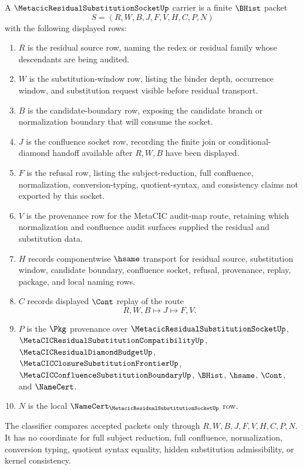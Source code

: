 \begin{definition}
\label{def:metacic-residual-substitution-socket-carrier}
A $\MetacicResidualSubstitutionSocketUp$ carrier is a finite $\BHist$ packet
$$
S=(R,W,B,J,F,V,H,C,P,N)
$$
with the following displayed rows:
\begin{enumerate}
\item $R$ is the residual source row, naming the redex or residual family whose descendants are being audited.
\item $W$ is the substitution-window row, listing the binder depth, occurrence window, and substitution request visible before residual transport.
\item $B$ is the candidate-boundary row, exposing the candidate branch or normalization boundary that will consume the socket.
\item $J$ is the confluence socket row, recording the finite join or conditional-diamond handoff available after $R,W,B$ have been displayed.
\item $F$ is the refusal row, listing the subject-reduction, full confluence, normalization, conversion-typing, quotient-syntax, and consistency claims not exported by this socket.
\item $V$ is the provenance row for the MetaCIC audit-map route, retaining which normalization and confluence audit surfaces supplied the residual and substitution data.
\item $H$ records componentwise $\hsame$ transport for residual source, substitution window, candidate boundary, confluence socket, refusal, provenance, replay, package, and local naming rows.
\item $C$ records displayed $\Cont$ replay of the route
$$
R,W,B \longmapsto J \longmapsto F,V .
$$
\item $P$ is the $\Pkg$ provenance over $\MetacicResidualSubstitutionSocketUp$, $\MetaCICResidualSubstitutionCompatibilityUp$, $\MetaCICResidualDiamondBudgetUp$, $\MetaCICClosureSubstitutionFrontierUp$, $\MetaCICConfluenceSubstitutionBoundaryUp$, $\BHist$, $\hsame$, $\Cont$, and $\NameCert$.
\item $N$ is the local $\NameCert_{\MetacicResidualSubstitutionSocketUp}$ row.
\end{enumerate}
The classifier compares accepted packets only through $R,W,B,J,F,V,H,C,P,N$. It has no coordinate for full subject reduction, full confluence, normalization, conversion typing, quotient syntax equality, hidden substitution admissibility, or kernel consistency.
\end{definition}

